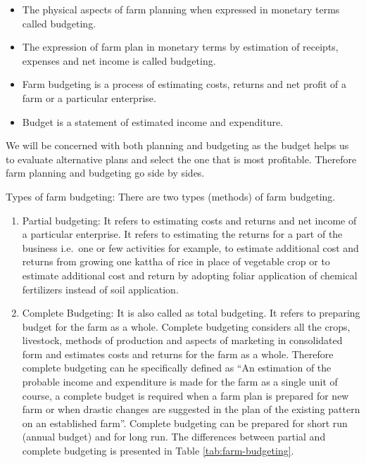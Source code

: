 \documentclass[11pt,]{book}
\providecommand{\tightlist}{%
  \setlength{\itemsep}{0pt}\setlength{\parskip}{0pt}}
\theoremstyle{definition}
\theoremstyle{definition}
\theoremstyle{definition}
\theoremstyle{remark}
\begin{document}
\begin{itemize}
\tightlist
\item
  The physical aspects of farm planning when expressed in monetary terms
  called budgeting.
\item
  The expression of farm plan in monetary terms by estimation of
  receipts, expenses and net income is called budgeting.
\item
  Farm budgeting is a process of estimating costs, returns and net
  profit of a farm or a particular enterprise.
\item
  Budget is a statement of estimated income and expenditure.
\end{itemize}

We will be concerned with both planning and budgeting as the budget
helps us to evaluate alternative plans and select the one that is most
profitable. Therefore farm planning and budgeting go side by sides.

Types of farm budgeting: There are two types (methods) of farm
budgeting.

\begin{enumerate}
\def\labelenumi{\arabic{enumi}.}
\item
  Partial budgeting: It refers to estimating costs and returns and net
  income of a particular enterprise. It refers to estimating the returns
  for a part of the business i.e.~one or few activities for example, to
  estimate additional cost and returns from growing one kattha of rice
  in place of vegetable crop or to estimate additional cost and return
  by adopting foliar application of chemical fertilizers instead of soil
  application.
\item
  Complete Budgeting: It is also called as total budgeting. It refers to
  preparing budget for the farm as a whole. Complete budgeting considers
  all the crops, livestock, methods of production and aspects of
  marketing in consolidated form and estimates costs and returns for the
  farm as a whole. Therefore complete budgeting can he specifically
  defined as ``An estimation of the probable income and expenditure is
  made for the farm as a single unit of course, a complete budget is
  required when a farm plan is prepared for new farm or when drastic
  changes are suggested in the plan of the existing pattern on an
  established farm''. Complete budgeting can be prepared for short run
  (annual budget) and for long run. The differences between partial and
  complete budgeting is presented in Table \ref{tab:farm-budgeting}.
\end{enumerate}
\end{document}
